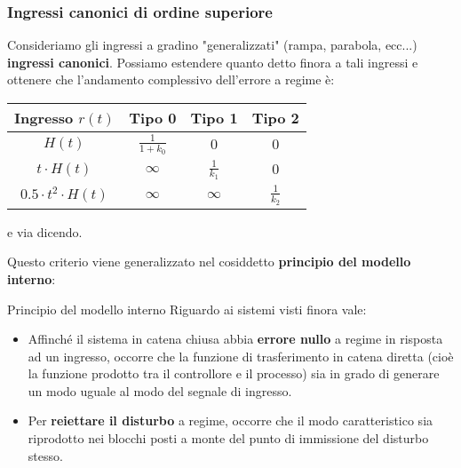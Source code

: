 \documentclass[a4paper,11pt]{article}
\begin{document}
\subsubsection{Ingressi canonici di ordine superiore}
Consideriamo gli ingressi a gradino "generalizzati" (rampa, parabola, ecc...) \textbf{ingressi canonici}.
Possiamo estendere quanto detto finora a tali ingressi e ottenere che l'andamento complessivo dell'errore a regime è:
\begin{table}[H]
	\center {}
	\begin{tabular} { c || c | c | c }
		\bfseries Ingresso $r(t)$ & \bfseries Tipo 0 & \bfseries Tipo 1 & \bfseries Tipo 2 \\
		\hline
		$H(t)$ & $\frac{1}{1 + k_0}$ & $0$ & $0$ \\
		$t \cdot H(t)$ & $\infty$ & $\frac{1}{k_1}$ & $0$ \\
		$0.5 \cdot t^2 \cdot H(t)$ & $\infty$ & $\infty$ & $\frac{1}{k_2}$ \\
	\end{tabular}
\end{table}
e via dicendo.

Questo criterio viene generalizzato nel cosiddetto \textbf{principio del modello interno}:
\begin{theorem}{Principio del modello interno}
	Riguardo ai sistemi visti finora vale:
	\begin{itemize}
		\item 
			Affinché il sistema in catena chiusa abbia \textbf{errore nullo} a regime in risposta ad un ingresso, occorre che la funzione di trasferimento in catena diretta (cioè la funzione prodotto tra il controllore e il processo) sia in grado di generare un modo uguale al modo del segnale di ingresso.
		\item
			Per \textbf{reiettare il disturbo} a regime, occorre che il modo caratteristico sia riprodotto nei blocchi posti a monte del punto di immissione del disturbo stesso.
	\end{itemize}
\end{theorem}
\end{document}
